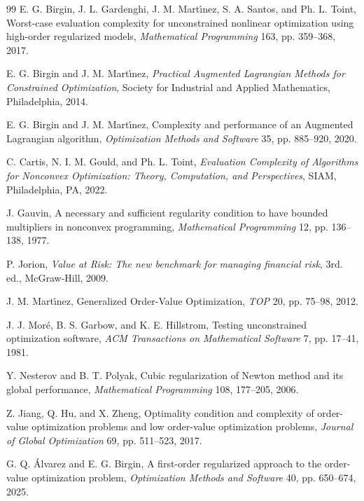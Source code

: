 \documentclass[11pt]{article}
\newcounter{alg}[section]
\begin{document}
\begin{thebibliography}{99}
 E. G. Birgin, J. L. Gardenghi, J. M. Mart\'{\i}nez, S. A. Santos, and Ph. L. Toint, Worst-case evaluation complexity for unconstrained nonlinear optimization using high-order regularized models, \textit{Mathematical Programming} 163, pp. 359--368, 2017.

 E. G. Birgin and J. M. Mart\'{\i}nez, \textit{Practical Augmented Lagrangian Methods for Constrained Optimization}, Society for Industrial and Applied Mathematics, Philadelphia, 2014.

 E. G. Birgin and J. M. Mart\'{\i}nez, Complexity and performance of an Augmented Lagrangian algorithm, \textit{Optimization Methods and Software} 35, pp. 885--920, 2020.

 C. Cartis, N. I. M. Gould, and Ph. L. Toint, \textit{Evaluation Complexity of Algorithms for Nonconvex Optimization: Theory, Computation, and Perspectives}, SIAM, Philadelphia, PA, 2022.

 J. Gauvin, A necessary and sufficient regularity condition to have bounded multipliers in nonconvex programming, \textit{Mathematical Programming} 12, pp. 136--138, 1977.
  
 P. Jorion, \textit{Value at {R}isk: {T}he new benchmark for managing financial risk}, 3rd. ed., McGraw-Hill, 2009.

 J. M. Mart\'{\i}nez, Generalized Order-Value Optimization, \textit{TOP} 20, pp. 75--98, 2012.

 J. J. Mor\'e, B. S. Garbow, and K. E. Hillstrom, Testing unconstrained optimization software, \textit{ACM Transactions on Mathematical Software} 7, pp. 17--41, 1981.
  
 Y. Nesterov and B. T. Polyak, Cubic regularization of Newton method and its global performance, \textit{Mathematical Programming} 108, 177--205, 2006.

 Z. Jiang, Q. Hu, and X. Zheng, Optimality condition and complexity of order-value optimization problems and low order-value optimization problems, \textit{Journal of Global Optimization} 69, pp. 511--523, 2017.

 G. Q. Álvarez and E. G. Birgin, A first-order regularized approach to the order-value optimization problem, \textit{Optimization Methods and Software} 40, pp. 650--674, 2025.
    
\end{thebibliography}
\end{document}

